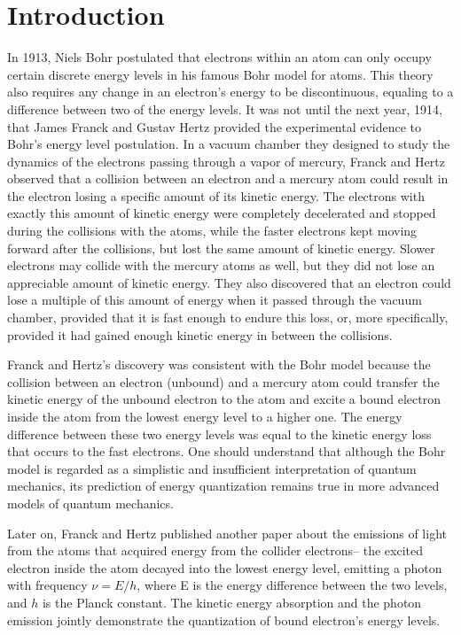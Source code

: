 \documentclass[prb,preprint]{revtex4-1}
\begin{document}
\maketitle 

\section{Introduction}
\label{introduction}

In 1913, Niels Bohr postulated that electrons within an atom can only occupy certain discrete energy levels in his famous Bohr model for atoms. This theory also requires any change in an electron's energy to be discontinuous, equaling to a difference between two of the energy levels. It was not until the next year, 1914, that James Franck and Gustav Hertz provided the experimental evidence to Bohr's energy level postulation. In a vacuum chamber they designed to study the dynamics of the electrons passing through a vapor of mercury, Franck and Hertz observed that a collision between an electron and a mercury atom could result in the electron losing a specific amount of its kinetic energy. The electrons with exactly this amount of kinetic energy were completely decelerated and stopped during the collisions with the atoms, while the faster electrons kept moving forward after the collisions, but lost the same amount of kinetic energy. Slower electrons may collide with the mercury atoms as well, but they did not lose an appreciable amount of kinetic energy.  They also discovered that an electron could lose a multiple of this amount of energy when it passed through the vacuum chamber, provided that it is fast enough to endure this loss, or, more specifically, provided it had gained enough kinetic energy in between the collisions.

Franck and Hertz's discovery was consistent with the Bohr model because the collision between an electron (unbound) and a mercury atom could transfer the kinetic energy of the unbound electron to the atom and excite a bound electron inside the atom from the lowest energy level to a higher one. The energy difference between these two energy levels was equal to the kinetic energy loss that occurs to the fast electrons. One should understand that although the Bohr model is regarded as a simplistic and insufficient interpretation of quantum mechanics, its prediction of energy quantization remains true in more advanced models of quantum mechanics.

Later on, Franck and Hertz published another paper about the emissions of light from the atoms that acquired energy from the collider electrons-- the excited electron inside the atom decayed into the lowest energy level, emitting a photon with frequency $\nu=E/h$, where E is the energy difference between the two levels, and $h$ is the Planck constant. The kinetic energy absorption and the photon emission jointly demonstrate the quantization of bound electron's energy levels.
\end{document}
